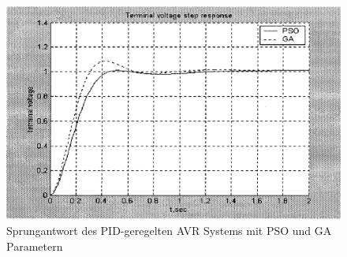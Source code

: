 \begin{figure}[hbtp]
    \centering
    \includegraphics[width=0.8\linewidth]{images/avr_mit_regler}
    \caption{Sprungantwort des PID-geregelten AVR Systems mit PSO und GA Parametern}
    \label{img:avr_mit_regler}
\end{figure}
